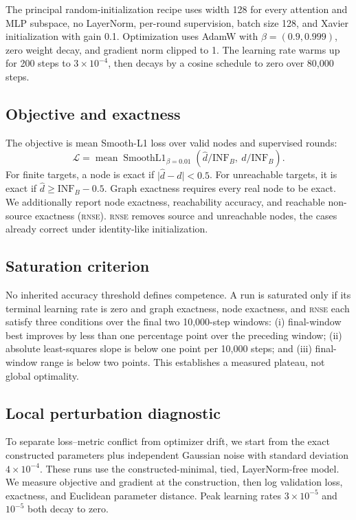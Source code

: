 \documentclass[10pt,twocolumn]{article}
\newcommand{\rnse}{\textsc{rnse}}
\newcommand{\infb}{\mathrm{INF}_{B}}
\begin{document}
The principal random-initialization recipe uses width 128 for every attention
and MLP subspace, no LayerNorm, per-round supervision, batch size 128, and
Xavier initialization with gain 0.1. Optimization uses AdamW with
\(\beta=(0.9,0.999)\), zero weight decay, and gradient norm clipped to 1. The
learning rate warms up for 200 steps to \(3\times10^{-4}\), then decays by a
cosine schedule to zero over 80,000 steps.

\subsection{Objective and exactness}

The objective is mean Smooth-L1 loss over valid nodes and supervised rounds:
\begin{equation}
 \mathcal{L}
 =
 \operatorname{mean}
 \operatorname{SmoothL1}_{\beta=0.01}
 \left(\hat d/\infb,\ d/\infb\right).
 \label{eq:loss}
\end{equation}
For finite targets, a node is exact if
\(\lvert\hat d-d\rvert<0.5\). For unreachable targets, it is exact if
\(\hat d\ge\infb-0.5\). Graph exactness requires every real node to be exact.
We additionally report node exactness, reachability accuracy, and reachable
non-source exactness (\rnse). \rnse{} removes source and unreachable nodes,
the cases already correct under identity-like initialization.

\subsection{Saturation criterion}

No inherited accuracy threshold defines competence. A run is saturated only
if its terminal learning rate is zero and graph exactness, node exactness, and
\rnse{} each satisfy three conditions over the final two 10,000-step windows:
(i) final-window best improves by less than one percentage point over the
preceding window; (ii) absolute least-squares slope is below one point per
10,000 steps; and (iii) final-window range is below two points. This establishes
a measured plateau, not global optimality.

\subsection{Local perturbation diagnostic}

To separate loss--metric conflict from optimizer drift, we start from the exact
constructed parameters plus independent Gaussian noise with standard
deviation \(4\times10^{-4}\). These runs use the constructed-minimal, tied,
LayerNorm-free model. We measure objective and gradient at the construction,
then log validation loss, exactness, and Euclidean parameter distance.
Peak learning rates \(3\times10^{-5}\) and \(10^{-5}\) both decay to zero.
\end{document}
